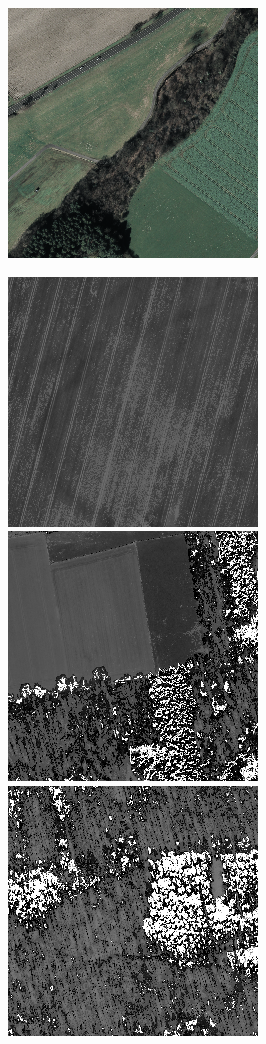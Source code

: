\begin{figure}
    \includegraphics[width=\VegetationIndicesImageWidth]{images/vegetation/original/5}

    \vspace{3mm}
    \includegraphics[width=\VegetationIndicesImageWidth]{images/vegetation/evi/1} \hfill
    \includegraphics[width=\VegetationIndicesImageWidth]{images/vegetation/evi/2} \hfill
    \includegraphics[width=\VegetationIndicesImageWidth]{images/vegetation/evi/3} \hfill

\end{figure}
